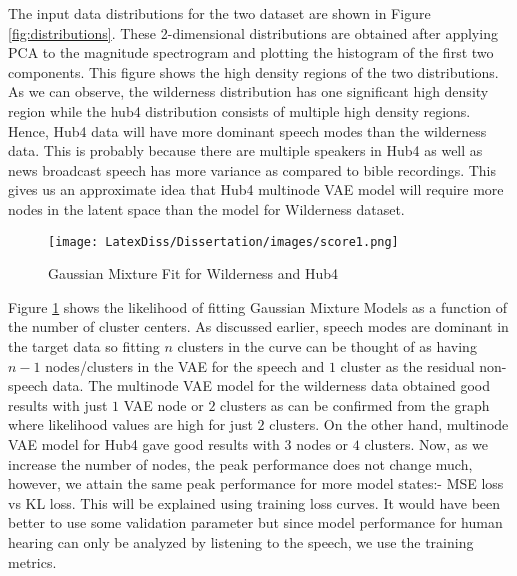 The input data distributions for the two dataset are shown in Figure \ref{fig:distributions}. These 2-dimensional distributions are obtained after applying PCA to the magnitude spectrogram and plotting the histogram of the first two components. This figure shows the high density regions of the two distributions. As we can observe, the wilderness distribution has one significant high density region while the hub4 distribution consists of multiple high density regions. Hence, Hub4 data will have more dominant speech modes than the wilderness data. This is probably because there are multiple speakers in Hub4 as well as news broadcast speech has more variance as compared to bible recordings. This gives us an approximate idea that Hub4 multinode VAE model will require more nodes in the latent space than the model for Wilderness dataset. \\

\begin{figure}[h!]
    \centering
    \texttt{[image: LatexDiss/Dissertation/images/score1.png]}
    \caption{Gaussian Mixture Fit for Wilderness and Hub4}
    \label{fig:GMM}
\end{figure}

Figure \ref{fig:GMM} shows the likelihood of fitting Gaussian Mixture Models as a function of the number of cluster centers. As discussed earlier, speech modes are dominant in the target data so fitting $n$ clusters in the curve can be thought of as having $n-1$ nodes/clusters in the VAE for the speech and $1$ cluster as the residual non-speech data. The multinode VAE model for the wilderness data obtained good results with just $1$ VAE node or $2$ clusters as can be confirmed from the graph where likelihood values are high for just $2$ clusters. On the other hand, multinode VAE model for Hub4 gave good results with $3$ nodes or $4$ clusters. Now, as we increase the number of nodes, the peak performance does not change much, however, we attain the same peak performance for more model states:- MSE loss vs KL loss. This will be explained using training loss curves. It would have been better to use some validation parameter but since model performance for human hearing can only be analyzed by listening to the speech, we use the training metrics. \\


